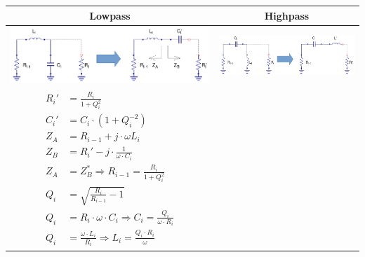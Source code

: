 \begin{table}[H]
  \centering
  \begin{tabular}{ | c | c | }
    \hline
    Lowpass & Highpass\\ \hline
    \begin{minipage}{.4\textwidth}
      \includegraphics[width=\linewidth]{./images/Synthesis/Impedance_Matching/cascaded-l-section-lowpass}
    \end{minipage}
    &
    \begin{minipage}{.4\textwidth}
      \includegraphics[width=\linewidth]{./images/Synthesis/Impedance_Matching/cascaded-l-section-highpass}
    \end{minipage}
\\ \hline
    \begin{minipage}{.4\textwidth}
         {\begin{align}
           R_i' &= \frac{R_i}{1 + Q_i^2} \\
           C_i' &= C_i \cdot (1 + Q_i^{-2}) \\
           Z_A &= R_{i-1} + j \cdot \omega L_i \\
           Z_B &= R_{i}' - j \cdot \frac{1}{\omega \cdot C_i} \\
           Z_A &= Z_B^* \Longrightarrow R_{i-1} = \frac{R_i}{1 + Q_i^2} \\
           Q_{i} &= \sqrt{\frac{R_{i}}{R_{i-1}} - 1} \\
           Q_{i} &= R_{i} \cdot \omega \cdot C_i \Longrightarrow C_i = \frac{Q_i}{\omega \cdot R_i}\\
           Q_{i} &= \frac{\omega \cdot L_i}{R_{i}} \Longrightarrow L_i = \frac{Q_i \cdot R_i}{\omega}
         \end{align}}
    \end{minipage}

\end{tabular}
\end{table}
